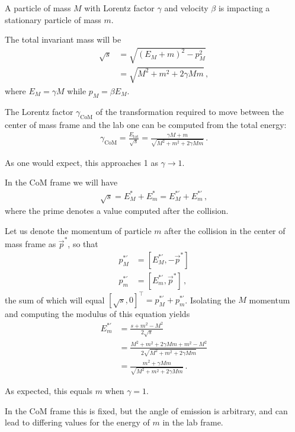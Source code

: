 \documentclass[main.tex]{subfiles}
\begin{document}
\begin{extracontent}
A particle of mass \(M\) with Lorentz factor \(\gamma \) and velocity \(\beta \) is impacting a stationary particle of mass \(m\). 

The total invariant mass will be 
%
\begin{align}
\sqrt{s} &= \sqrt{(E_M + m)^2  - p_M^2}  \\
&= \sqrt{M^2 + m^2 + 2 \gamma Mm}
\,,
\end{align}
%
where \(E_M = \gamma M\) while \(p_M = \beta E_M\).

The Lorentz factor \(\gamma _{\text{CoM}}\) of the transformation required to move between the center of mass frame and the lab one can be computed from the total energy: 
%
\begin{align}
\gamma _{\text{CoM}} = \frac{E_{\text{tot}}}{\sqrt{s}} = \frac{\gamma M + m}{\sqrt{M^2 + m^2 + 2 \gamma Mm}}
\,.
\end{align}

As one would expect, this approaches 1 as \(\gamma \to 1\). 

In the CoM frame we will have 
%
\begin{align}
\sqrt{s} = E^{*}_M + E^{*}_m = E^{* \prime}_M + E^{* \prime}_m
\,,
\end{align}
%
where the prime denotes a value computed after the collision. 

Let us denote the momentum of particle \(m\) after the collision in the center of mass frame as \(\vec{p}^{*}\), so that 
%
\begin{align}
p_M^{* \prime} &= [E^{* \prime}_M, -\vec{p}^{*}] \\
p_m^{* \prime} &= [E^{* \prime}_m, \vec{p}^{*}]
\,,
\end{align}
%
the sum of which will equal \([\sqrt{s}, 0]^{\top} = p^{*\prime}_M + p^{*\prime}_m\).
Isolating the \(M\) momentum and computing the modulus of this equation yields 
%
\begin{align}
E_m^{*\prime} &= \frac{s + m^2 - M^2}{2 \sqrt{s}}  \\
&= \frac{M^2 + m^2 + 2 \gamma Mm + m^2 - M^2}{2 \sqrt{M^2 + m^2 + 2 \gamma Mm}}  \\
&= \frac{m^2 + \gamma Mm}{\sqrt{M^2 + m^2 + 2 \gamma Mm}}
\,.
\end{align}

As expected, this equals \(m\) when \(\gamma = 1\). 

In the CoM frame this is fixed, but the angle of emission is arbitrary, and can lead to differing values for the energy of \(m\) in the lab frame.


\end{extracontent}
\end{document}
